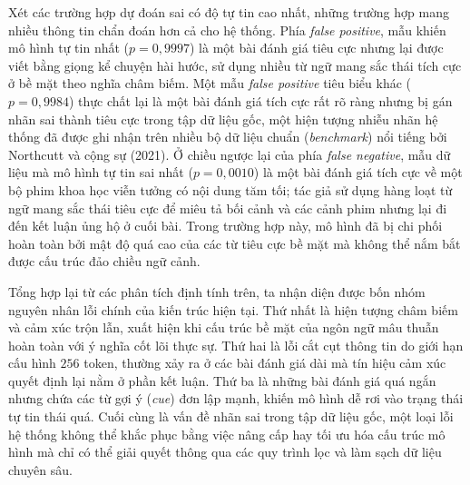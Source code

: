 Xét các trường hợp dự đoán sai có độ tự tin cao nhất, những trường hợp mang nhiều thông tin chẩn đoán hơn cả cho hệ thống. Phía \textit{false positive}, mẫu khiến mô hình tự tin nhất ($p = 0,9997$) là một bài đánh giá tiêu cực nhưng lại được viết bằng giọng kể chuyện hài hước, sử dụng nhiều từ ngữ mang sắc thái tích cực ở bề mặt theo nghĩa châm biếm. Một mẫu \textit{false positive} tiêu biểu khác ($p = 0,9984$) thực chất lại là một bài đánh giá tích cực rất rõ ràng nhưng bị gán nhãn sai thành tiêu cực trong tập dữ liệu gốc, một hiện tượng nhiễu nhãn hệ thống đã được ghi nhận trên nhiều bộ dữ liệu chuẩn (\textit{benchmark}) nổi tiếng bởi Northcutt và cộng sự (2021). Ở chiều ngược lại của phía \textit{false negative}, mẫu dữ liệu mà mô hình tự tin sai nhất ($p = 0,0010$) là một bài đánh giá tích cực về một bộ phim khoa học viễn tưởng có nội dung tăm tối; tác giả sử dụng hàng loạt từ ngữ mang sắc thái tiêu cực để miêu tả bối cảnh và các cảnh phim nhưng lại đi đến kết luận ủng hộ ở cuối bài. Trong trường hợp này, mô hình đã bị chi phối hoàn toàn bởi mật độ quá cao của các từ tiêu cực bề mặt mà không thể nắm bắt được cấu trúc đảo chiều ngữ cảnh.

Tổng hợp lại từ các phân tích định tính trên, ta nhận diện được bốn nhóm nguyên nhân lỗi chính của kiến trúc hiện tại. Thứ nhất là hiện tượng châm biếm và cảm xúc trộn lẫn, xuất hiện khi cấu trúc bề mặt của ngôn ngữ mâu thuẫn hoàn toàn với ý nghĩa cốt lõi thực sự. Thứ hai là lỗi cắt cụt thông tin do giới hạn cấu hình $256$ token, thường xảy ra ở các bài đánh giá dài mà tín hiệu cảm xúc quyết định lại nằm ở phần kết luận. Thứ ba là những bài đánh giá quá ngắn nhưng chứa các từ gợi ý (\textit{cue}) đơn lập mạnh, khiến mô hình dễ rơi vào trạng thái tự tin thái quá. Cuối cùng là vấn đề nhãn sai trong tập dữ liệu gốc, một loại lỗi hệ thống không thể khắc phục bằng việc nâng cấp hay tối ưu hóa cấu trúc mô hình mà chỉ có thể giải quyết thông qua các quy trình lọc và làm sạch dữ liệu chuyên sâu.